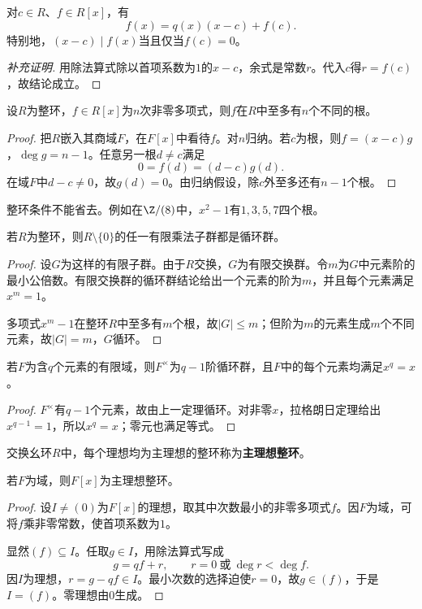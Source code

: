 \begin{corollary}
对$c\in R$、$f\in R[x]$，有
\[
f(x)=q(x)(x-c)+f(c).
\]
特别地，$(x-c)\mid f(x)$当且仅当$f(c)=0$。
\end{corollary}
\begin{proof}[补充证明]
用除法算式除以首项系数为$1$的$x-c$，余式是常数$r$。代入$c$得$r=f(c)$，故结论成立。
\end{proof}

\begin{theorem}\label{p2:poly-roots}
设$R$为整环，$f\in R[x]$为$n$次非零多项式，则$f$在$R$中至多有$n$个不同的根。
\end{theorem}
\begin{proof}
把$R$嵌入其商域$F$，在$F[x]$中看待$f$。对$n$归纳。若$c$为根，则$f=(x-c)g$，$\deg g=n-1$。任意另一根$d\ne c$满足
\[
0=f(d)=(d-c)g(d).
\]
在域$F$中$d-c\ne0$，故$g(d)=0$。由归纳假设，除$c$外至多还有$n-1$个根。
\end{proof}

\begin{remark}
整环条件不能省去。例如在$\Z/(8)$中，$x^2-1$有$1,3,5,7$四个根。
\end{remark}

\begin{theorem}\label{p2:finite-multiplicative-subgroup}
若$R$为整环，则$R\setminus\{0\}$的任一有限乘法子群都是循环群。
\end{theorem}
\begin{proof}
设$G$为这样的有限子群。由于$R$交换，$G$为有限交换群。令$m$为$G$中元素阶的最小公倍数。有限交换群的循环群结论给出一个元素的阶为$m$，并且每个元素满足$x^m=1$。

多项式$x^m-1$在整环$R$中至多有$m$个根，故$|G|\leq m$；但阶为$m$的元素生成$m$个不同元素，故$|G|=m$，$G$循环。
\end{proof}

\begin{corollary}
若$F$为含$q$个元素的有限域，则$F^\times$为$q-1$阶循环群，且$F$中的每个元素均满足$x^q=x$。
\end{corollary}
\begin{proof}
$F^\times$有$q-1$个元素，故由上一定理循环。对非零$x$，拉格朗日定理给出$x^{q-1}=1$，所以$x^q=x$；零元也满足等式。
\end{proof}

\begin{definition}
交换幺环$R$中，每个理想均为主理想的整环称为\textbf{主理想整环}。
\end{definition}
\begin{theorem}\label{p2:field-poly-pid}
若$F$为域，则$F[x]$为主理想整环。
\end{theorem}
\begin{proof}
设$I\ne(0)$为$F[x]$的理想，取其中次数最小的非零多项式$f$。因$F$为域，可将$f$乘非零常数，使首项系数为$1$。

显然$(f)\subseteq I$。任取$g\in I$，用除法算式写成
\[
g=qf+r,\qquad r=0\ \text{或}\ \deg r<\deg f.
\]
因$I$为理想，$r=g-qf\in I$。最小次数的选择迫使$r=0$，故$g\in(f)$，于是$I=(f)$。零理想由$0$生成。
\end{proof}

